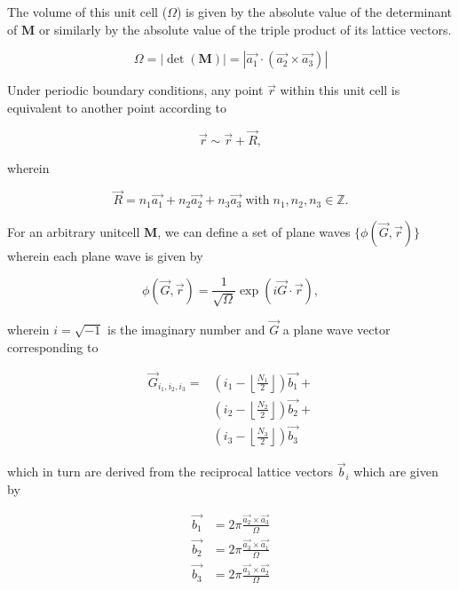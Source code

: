 The volume of this unit cell ($\Omega$) is given by the absolute value of the determinant of $\mathbf{M}$ or similarly by the absolute value of the triple product of its lattice vectors.

\begin{equation}
    \Omega = \left|\det \left( \mathbf{M} \right)\right| = \left|\vec{a_{1}} \cdot \left(\vec{a_{2}} \times \vec{a_{3}} \right)\right|
\end{equation}

Under periodic boundary conditions, any point $\vec{r}$ within this unit cell is equivalent to another point according to

\begin{equation}
    \vec{r} \sim \vec{r} + \vec{R},
\end{equation}

wherein

\begin{equation}
    \vec{R} = n_{1}\vec{a_{1}} + n_{2}\vec{a_{2}} + n_{3}\vec{a_{3}} \; \text{with} \; n_{1},n_{2},n_{3} \in \mathbb{Z}.
\end{equation}

For an arbitrary unitcell $\mathbf{M}$, we can define a set of plane waves $\{ \phi(\vec{G},\vec{r}) \}$ wherein each plane wave is given by

\begin{equation}
    \phi(\vec{G},\vec{r}) = \frac{1}{\sqrt{\Omega}} \exp \left(i \vec{G} \cdot \vec{r} \right),
    \label{eq:pwexpr}
\end{equation}

wherein $i = \sqrt{-1}$ is the imaginary number and $\vec{G}$ a plane wave vector corresponding to

\begin{align}
    \vec{G}_{i_{1},i_{2},i_{3}} = 
    &\left(i_{1} - \left\lfloor\frac{N_{1}}{2}\right\rfloor \right)\vec{b_{1}} + \label{eq:gvectors} \\ \nonumber
    &\left(i_{2} - \left\lfloor\frac{N_{2}}{2}\right\rfloor \right)\vec{b_{2}} + \\ \nonumber
    &\left(i_{3} - \left\lfloor\frac{N_{3}}{2}\right\rfloor \right)\vec{b_{3}}
\end{align}

which in turn are derived from the reciprocal lattice vectors $\vec{b}_{i}$ which are given by

\begin{align}
    \vec{b_{1}} &= 2 \pi \frac{\vec{a_{2}} \times \vec{a_{3}}}{\Omega} \label{eq:reciproc-latv1} \\ 
    \vec{b_{2}} &= 2 \pi \frac{\vec{a_{3}} \times \vec{a_{1}}}{\Omega} \label{eq:reciproc-latv2} \\ 
    \vec{b_{3}} &= 2 \pi \frac{\vec{a_{1}} \times \vec{a_{2}}}{\Omega} \label{eq:reciproc-latv3}
\end{align}


